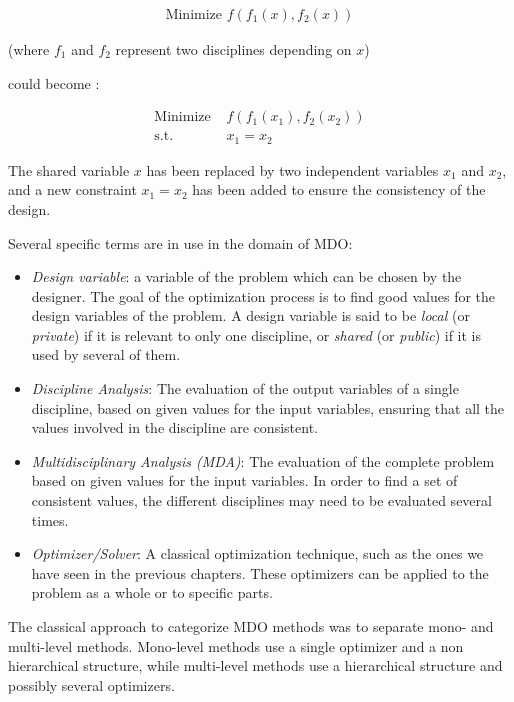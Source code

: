 \begin{align*}
\text{Minimize } f(f_1(x), f_2(x))
\end{align*}

(where $f_1$ and $f_2$ represent two disciplines depending on $x$)

could become :

\begin{align*}
\text{Minimize } &f(f_1(x_1), f_2(x_2))\\
\text{s.t. } &x_1=x_2
\end{align*}

The shared variable $x$ has been replaced by two independent variables $x_1$ and $x_2$, and a new constraint $x_1=x_2$ has been added to ensure the consistency of the design.

Several specific terms are in use in the domain of MDO:

\begin{itemize}

\item \emph{Design variable}: a variable of the problem which can be chosen by the designer. The goal of the optimization process is to find good values for the design variables of the problem. A design variable is said to be \emph{local} (or \emph{private}) if it is relevant to only one discipline, or \emph{shared} (or \emph{public}) if it is used by several of them.

\item \emph{Discipline Analysis}: The evaluation of the output variables of a single discipline, based on given values for the input variables, ensuring that all the values involved in the discipline are consistent.

\item \emph{Multidisciplinary Analysis (MDA)}: The evaluation of the complete problem based on given values for the input variables. In order to find a set of consistent values, the different disciplines may need to be evaluated several times.

\item \emph{Optimizer/Solver}: A classical optimization technique, such as the ones we have seen in the previous chapters. These optimizers can be applied to the problem as a whole or to specific parts.

\end{itemize}

The classical approach to categorize MDO methods was to separate mono- and multi-level methods.
Mono-level methods use a single optimizer and a non hierarchical structure, while multi-level methods use a hierarchical structure and possibly several optimizers.

